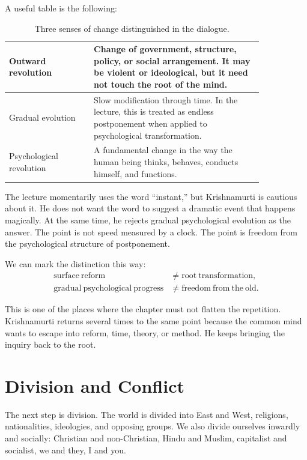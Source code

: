 A useful table is the following:
\begin{table}
\centering
\begin{tabular}{|p{0.28\linewidth}|p{0.56\linewidth}|}
\hline
Outward revolution & Change of government, structure, policy, or social arrangement. It may be violent or ideological, but it need not touch the root of the mind.\\
\hline
Gradual evolution & Slow modification through time. In the lecture, this is treated as endless postponement when applied to psychological transformation.\\
\hline
Psychological revolution & A fundamental change in the way the human being thinks, behaves, conducts himself, and functions.\\
\hline
\end{tabular}
\caption{Three senses of change distinguished in the dialogue.}
\end{table}

The lecture momentarily uses the word ``instant,'' but Krishnamurti is cautious about it. He does not want the word to suggest a dramatic event that happens magically. At the same time, he rejects gradual psychological evolution as the answer. The point is not speed measured by a clock. The point is freedom from the psychological structure of postponement.

We can mark the distinction this way:
\begin{align}
\mathrm{surface\ reform}
&\ne
\mathrm{root\ transformation},\\
\mathrm{gradual\ psychological\ progress}
&\ne
\mathrm{freedom\ from\ the\ old}.
\end{align}

This is one of the places where the chapter must not flatten the repetition. Krishnamurti returns several times to the same point because the common mind wants to escape into reform, time, theory, or method. He keeps bringing the inquiry back to the root.

\section{Division and Conflict}

The next step is division. The world is divided into East and West, religions, nationalities, ideologies, and opposing groups. We also divide ourselves inwardly and socially: Christian and non-Christian, Hindu and Muslim, capitalist and socialist, we and they, I and you.

